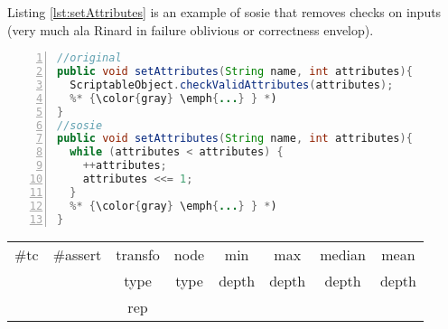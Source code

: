 Listing \ref{lst:setAttributes} is an example of sosie that removes checks on inputs (very much ala Rinard in failure oblivious or correctness envelop).

\begin{minipage}{\columnwidth}
\begin{lstlisting}[caption={\texttt{setAttributes} in Rhino and a sosie},label=lst:setAttributes,language=java,numbers=left]
//original
public void setAttributes(String name, int attributes){
  ScriptableObject.checkValidAttributes(attributes);
  %* {\color{gray} \emph{...} } *)
}
//sosie
public void setAttributes(String name, int attributes){
  while (attributes < attributes) {
    ++attributes;
    attributes <<= 1;
  }
  %* {\color{gray} \emph{...} } *)
}\end{lstlisting}
\tabcolsep=0.11cm
\begin{tabular}{>{\small}c>{\small}c>{\small}c>{\small}c>{\small}c>{\small}c>{\small}c>{\small}c}
\hline
\rowcolor{lightgray} \#tc & \#assert & transfo & node & min & max & median & mean   \\
\rowcolor{lightgray}  & & type & type & depth  & depth & depth & depth  \\ 
\hline
&  & rep &  &  &  &  & \\
\hline
\end{tabular}
\end{minipage}


